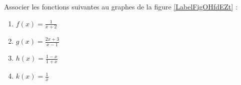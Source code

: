 
\begin{exercice}\label{exosmath-0334}

    Associer les fonctions suivantes au graphes de la figure \ref{LabelFigOHfdEZt} :
    \newcommand{\CaptionFigOHfdEZt}{Les graphes de l'exercice \ref{exosmath-0334}.}


\begin{multicols}{3}
    \begin{enumerate}
        \item
            \( f(x)=\frac{1}{ x+2 }\)
        \item
            \( g(x)=\frac{ 2x+3 }{ x-1 }\)
        \item
            \( h(x)=\frac{ 1-x }{ 1+x }\)
        \item
            \( k(x)=\frac{ 1 }{ x }\)
    \end{enumerate}
\end{multicols}

\end{exercice}
